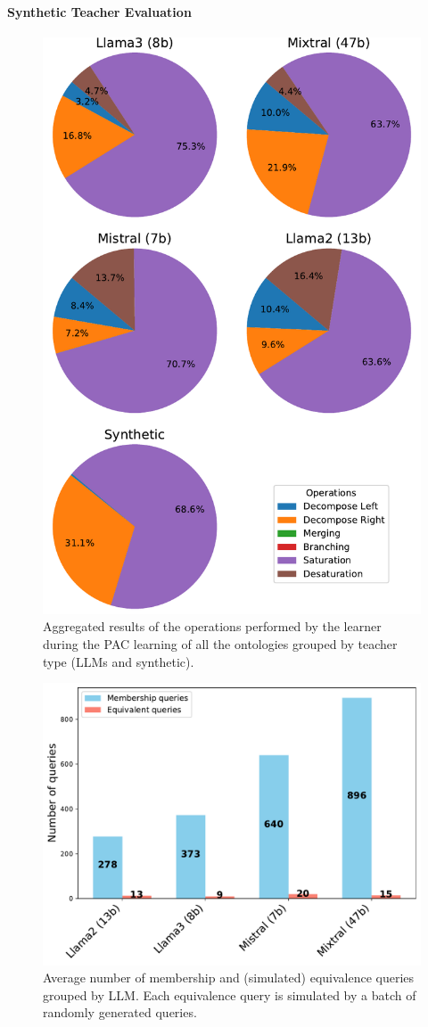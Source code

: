 \paragraph{Synthetic Teacher Evaluation}
\label{par:synthetic-teacher-evaluation}
%

%
\begin{figure}
    \centering
    \includegraphics[width=0.75\linewidth]{figures/combined_models}
    \caption[Learner operations by teacher type]{%
        Aggregated results of the operations performed by the learner during the \gls{PAC} learning of all the ontologies grouped by teacher type (\glspl{LLM} and synthetic).
    }
    \label{fig:learner-operations-models}
\end{figure}
%
\begin{figure}
    \centering
    \includegraphics[width=0.75\linewidth]{figures/query_counts_by_model}
    \caption[Queries by \gls{LLM}]{%
        Average number of membership and (simulated) equivalence queries grouped by \gls{LLM}.
        Each equivalence query is simulated by a batch of randomly generated queries.
    }
    \label{fig:queries}
\end{figure}
